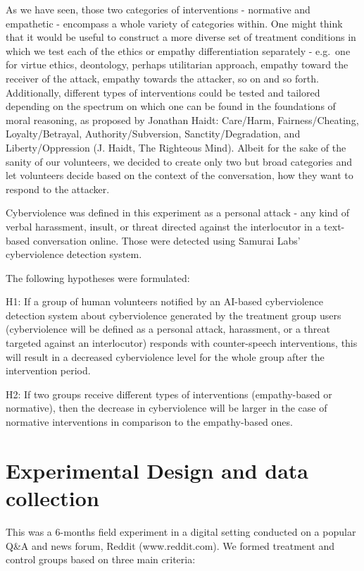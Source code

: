 \documentclass[
  10pt,
  dvipsnames,enabledeprecatedfontcommands]{scrartcl}
\begin{document}
As we have seen, those two categories of interventions - normative and
empathetic - encompass a whole variety of categories within. One might
think that it would be useful to construct a more diverse set of
treatment conditions in which we test each of the ethics or empathy
differentiation separately - e.g.~one for virtue ethics, deontology,
perhaps utilitarian approach, empathy toward the receiver of the attack,
empathy towards the attacker, so on and so forth. Additionally,
different types of interventions could be tested and tailored depending
on the spectrum on which one can be found in the foundations of moral
reasoning, as proposed by Jonathan Haidt: Care/Harm, Fairness/Cheating,
Loyalty/Betrayal, Authority/Subversion, Sanctity/Degradation, and
Liberty/Oppression (J. Haidt, The Righteous Mind). Albeit for the sake
of the sanity of our volunteers, we decided to create only two but broad
categories and let volunteers decide based on the context of the
conversation, how they want to respond to the attacker.

Cyberviolence was defined in this experiment as a personal attack - any
kind of verbal harassment, insult, or threat directed against the
interlocutor in a text-based conversation online. Those were detected
using Samurai Labs' cyberviolence detection system.

The following hypotheses were formulated:

H1: If a group of human volunteers notified by an AI-based cyberviolence
detection system about cyberviolence generated by the treatment group
users (cyberviolence will be defined as a personal attack, harassment,
or a threat targeted against an interlocutor) responds with
counter-speech interventions, this will result in a decreased
cyberviolence level for the whole group after the intervention period.

H2: If two groups receive different types of interventions
(empathy-based or normative), then the decrease in cyberviolence will be
larger in the case of normative interventions in comparison to the
empathy-based ones.

\hypertarget{experimental-design-and-data-collection}{%
\section{Experimental Design and data
collection}\label{experimental-design-and-data-collection}}

This was a 6-months field experiment in a digital setting conducted on a
popular Q\&A and news forum, Reddit (www.reddit.com). We formed
treatment and control groups based on three main criteria:
\end{document}
